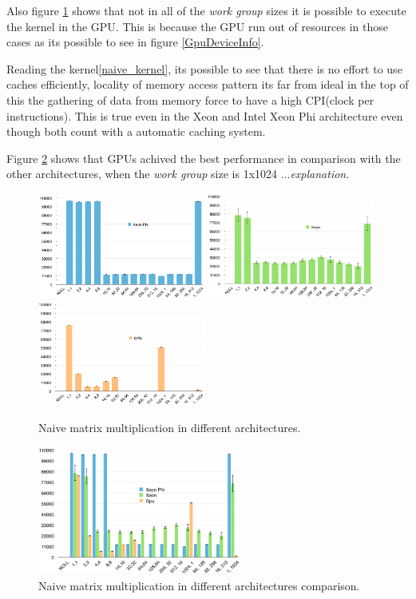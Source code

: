 \par{Also figure \ref{Naive} shows that not in all of the \emph{work group} sizes it is possible to execute the kernel in the GPU. 
This is because the GPU run out of resources in those cases\cite{opencl_error} as its possible to see in figure 
\ref{GpuDeviceInfo}.}

\par{Reading the kernel\ref{naive_kernel}, its possible to see that there is no effort to use caches efficiently, locality of
memory access pattern its far from ideal in the top of this the gathering of data from memory force to have a high CPI(clock per
instructions). This is true even in the Xeon and Intel Xeon Phi architecture even though both count with a automatic caching system.}

\par{Figure \ref{NaiveComp} shows that GPUs achived the best performance in comparison with the other architectures, when the 
    \emph{work group} size is 1x1024 ...\emph{explanation}.}

\begin{figure}[!h]
    \centering
    \includegraphics[width=0.49\textwidth]{figures/naive_phi.png}
    \includegraphics[width=0.49\textwidth]{figures/naive_cpu.png}
    \includegraphics[width=0.49\textwidth]{figures/naive_gpu.png}
    \caption{Naive matrix multiplication in different architectures.}
    \label{Naive}
\end{figure}

\begin{figure}[!h]
    \centering
    \includegraphics[width=0.6\textwidth]{figures/naive_comp.png}
    \caption{Naive matrix multiplication in different architectures comparison.}
    \label{NaiveComp}
\end{figure}

